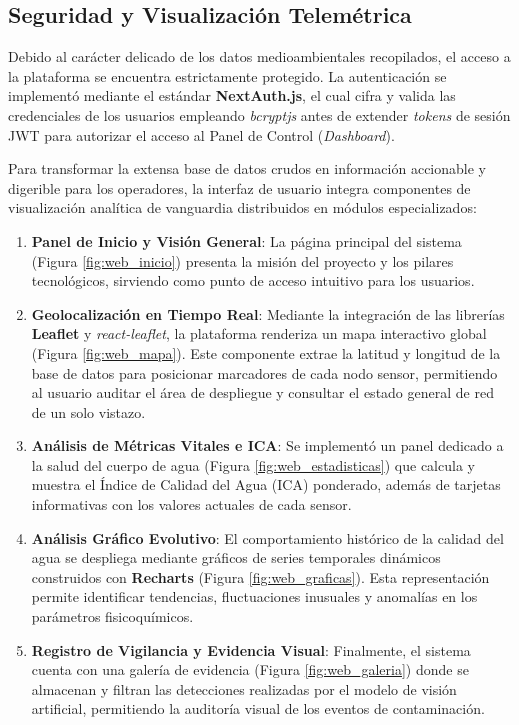 \subsection{Seguridad y Visualización Telemétrica}
\label{subsec:seguridad_y_visualizacion}

Debido al carácter delicado de los datos medioambientales recopilados, el acceso a la plataforma se encuentra estrictamente protegido. La autenticación se implementó mediante el estándar \textbf{NextAuth.js}, el cual cifra y valida las credenciales de los usuarios empleando \textit{bcryptjs} antes de extender \textit{tokens} de sesión JWT para autorizar el acceso al Panel de Control (\textit{Dashboard}).

Para transformar la extensa base de datos crudos en información accionable y digerible para los operadores, la interfaz de usuario integra componentes de visualización analítica de vanguardia distribuidos en módulos especializados:
\begin{enumerate}
    \item \textbf{Panel de Inicio y Visión General}: La página principal del sistema (Figura \ref{fig:web_inicio}) presenta la misión del proyecto y los pilares tecnológicos, sirviendo como punto de acceso intuitivo para los usuarios.
    \item \textbf{Geolocalización en Tiempo Real}: Mediante la integración de las librerías \textbf{Leaflet} y \textit{react-leaflet}, la plataforma renderiza un mapa interactivo global (Figura \ref{fig:web_mapa}). Este componente extrae la latitud y longitud de la base de datos para posicionar marcadores de cada nodo sensor, permitiendo al usuario auditar el área de despliegue y consultar el estado general de red de un solo vistazo.
    \item \textbf{Análisis de Métricas Vitales e ICA}: Se implementó un panel dedicado a la salud del cuerpo de agua (Figura \ref{fig:web_estadisticas}) que calcula y muestra el Índice de Calidad del Agua (ICA) ponderado, además de tarjetas informativas con los valores actuales de cada sensor.
    \item \textbf{Análisis Gráfico Evolutivo}: El comportamiento histórico de la calidad del agua se despliega mediante gráficos de series temporales dinámicos construidos con \textbf{Recharts} (Figura \ref{fig:web_graficas}). Esta representación permite identificar tendencias, fluctuaciones inusuales y anomalías en los parámetros fisicoquímicos.
    \item \textbf{Registro de Vigilancia y Evidencia Visual}: Finalmente, el sistema cuenta con una galería de evidencia (Figura \ref{fig:web_galeria}) donde se almacenan y filtran las detecciones realizadas por el modelo de visión artificial, permitiendo la auditoría visual de los eventos de contaminación.
\end{enumerate}

